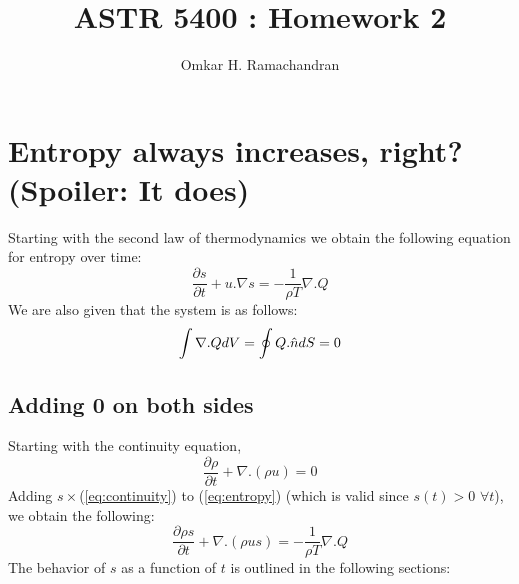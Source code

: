 \documentclass[english]{article}
\begin{document}
\title{ASTR 5400 : Homework 2}
\author{Omkar H. Ramachandran}

\maketitle

\section{Entropy always increases, right? (Spoiler: It does)}
Starting with the second law of thermodynamics we obtain the following 
equation for entropy over time:
\begin{equation}
	\frac{\partial s}{\partial t}+u.\nabla s=-\frac{1}{\rho T}
	\nabla . Q
	\label{eq:entropy}
\end{equation}
We are also given that the system is as follows:
\begin{equation}
	\intop \nabla . QdV = \oint Q.\hat{n}dS = 0
	\label{eq:bc}
\end{equation}

\subsection{Adding 0 on both sides}
Starting with the continuity equation,
\begin{equation}
	\frac{\partial \rho}{\partial t} + \nabla . (\rho u) = 0
	\label{eq:continuity}
\end{equation}
Adding $s\times$(\ref{eq:continuity}) to (\ref{eq:entropy}) (which is valid
since $s(t)>0$ $\forall t$), we obtain the following:
\begin{equation}
	\frac{\partial \rho s}{\partial t}+\nabla.(\rho us)=-\frac{1}{\rho T}
	\nabla .Q 
	\label{eq:morphed}
\end{equation}
The behavior of $s$ as a function of $t$ is outlined in the following 
sections:
\end{document}
